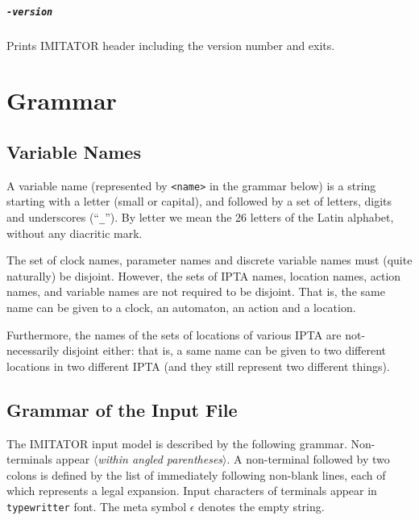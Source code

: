\documentclass[a4paper,11pt]{report}
\newcommand{\emptystring}{$\epsilon$}
\newcommand{\imitator}{\textsf{IMITATOR}}
\newcommand{\IPTA}{IPTA}
\newcommand{\nt}[1]{$\langle$\emph{#1}$\rangle$}
\newcommand{\styleIMI}[1]{\textcolor{imicolor}{\texttt{#1}}}
\newcommand{\styleOption}[1]{\textcolor{optioncolor}{\texttt{#1}}}
\begin{document}
\paragraph{\styleOption{-version}}
Prints \imitator{} header including the version number and exits.



\chapter{Grammar}\label{chapter:grammar}


\section{Variable Names}

A variable name (represented by \styleIMI{<name>} in the grammar below) is a string starting with a letter (small or capital), and followed by a set of letters, digits and underscores (``\styleIMI{\_}'').
By letter we mean the 26 letters of the Latin alphabet, without any diacritic mark.

The set of clock names, parameter names and discrete variable names must (quite naturally) be disjoint.
However, the sets of \IPTA{} names, location names, action names, and variable names are not required to be disjoint.
That is, the same name can be given to a clock, an automaton, an action and a location.

Furthermore, the names of the sets of locations of various \IPTA{} are not-necessarily disjoint either: that is, a same name can be given to two different locations in two different \IPTA{} (and they still represent two different things).


\section{Grammar of the Input File}

The \imitator{} input model is described by the following grammar.
Non-terminals appear \nt{within angled parentheses}.
A non-terminal followed by two colons is defined by the list of immediately following non-blank lines, each of which represents a legal expansion.
Input characters of terminals appear in \styleIMI{typewritter} font.
The meta symbol \emptystring{} denotes the empty string.
\end{document}
